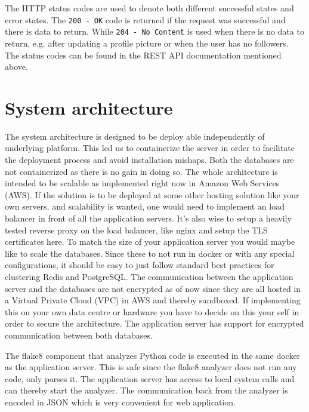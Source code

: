 \documentclass[12pt,a4paper]{report}
\begin{document}
The HTTP status codes are used to denote both different successful states and error states. The \texttt{200 - OK} code is returned if the request was successful and there is data to return. While \texttt{204 - No Content} is used when there is no data to return, e.g. after updating a profile picture or when the user has no followers. The status codes can be found in the REST API documentation mentioned above.

\chapter{System architecture}
The system architecture is designed to be deploy able independently of underlying platform. This led us to containerize the server in order to facilitate the deployment process and avoid installation mishaps. Both the databases are not containerized as there is no gain in doing so.
The whole architecture is intended to be scalable as implemented right now in Amazon Web Services (AWS). If the solution is to be deployed at some other hosting solution like your own servers, and scalability is wanted, one would need to implement an load balancer in front of all the application servers. It's also wise to setup a heavily tested reverse proxy on the load balancer, like nginx and setup the TLS certificates here. To match the size of your application server you would maybe like to scale the databases. Since these to not run in docker or with any special configurations, it should be easy to just follow standard best practices for clustering Redis and PostgreSQL.
The communication between the application server and the databases are not encrypted as of now since they are all hosted in a Virtual Private Cloud (VPC) in AWS and thereby sandboxed. If implementing this on your own data centre or hardware you have to decide on this your self in order to secure the architecture. The application server has support for encrypted communication between both databases. 

The flake8 component that analyzes Python code is executed in the same docker as the application server. This is safe since the flake8 analyzer does not run any code, only parses it.
The application server has access to local system calls and can thereby start the analyzer. The communication back from the analyzer is encoded in JSON which is very convenient for web application.
\end{document}
